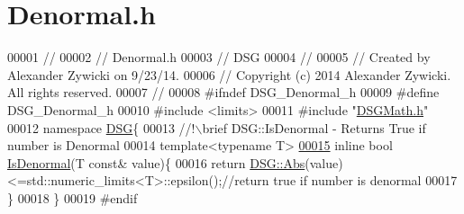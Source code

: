 \hypertarget{_denormal_8h_source}{\section{Denormal.\+h}
\label{_denormal_8h_source}
}

\begin{DoxyCode}
00001 \textcolor{comment}{//}
00002 \textcolor{comment}{//  Denormal.h}
00003 \textcolor{comment}{//  DSG}
00004 \textcolor{comment}{//}
00005 \textcolor{comment}{//  Created by Alexander Zywicki on 9/23/14.}
00006 \textcolor{comment}{//  Copyright (c) 2014 Alexander Zywicki. All rights reserved.}
00007 \textcolor{comment}{//}
00008 \textcolor{preprocessor}{#ifndef DSG\_Denormal\_h}
00009 \textcolor{preprocessor}{#define DSG\_Denormal\_h}
00010 \textcolor{preprocessor}{#include <limits>}
00011 \textcolor{preprocessor}{#include "\hyperlink{_d_s_g_math_8h}{DSGMath.h}"}
00012 \textcolor{keyword}{namespace }\hyperlink{namespace_d_s_g}{DSG}\{\textcolor{comment}{}
00013 \textcolor{comment}{    //!\(\backslash\)brief DSG::IsDenormal - Returns True if number is Denormal }
00014 \textcolor{comment}{}    \textcolor{keyword}{template}<\textcolor{keyword}{typename} T>
\hypertarget{_denormal_8h_source_l00015}{}\hyperlink{namespace_d_s_g_a9eee3c39a1f45d42f0b4fa7201d3ba3d}{00015}     \textcolor{keyword}{inline} \textcolor{keywordtype}{bool} \hyperlink{namespace_d_s_g_a9eee3c39a1f45d42f0b4fa7201d3ba3d}{IsDenormal}(T \textcolor{keyword}{const}& value)\{
00016         \textcolor{keywordflow}{return} \hyperlink{namespace_d_s_g_a0af03bade7e25e8da80e3022af0e45a7}{DSG::Abs}(value)<=std::numeric\_limits<T>::epsilon();\textcolor{comment}{//return true if number is
       denormal}
00017     \}
00018 \}
00019 \textcolor{preprocessor}{#endif}
\end{DoxyCode}

